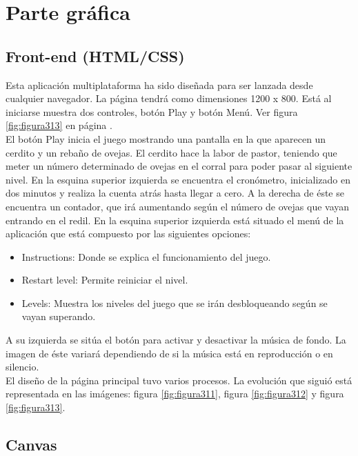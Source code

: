 \section{Parte gráfica}
\label{chap:grafica}

\subsection{Front-end (HTML/CSS)}
\label{sec:front_end}

Esta aplicación multiplataforma ha sido diseñada para ser lanzada desde cualquier navegador. La página tendrá como dimensiones 1200 x 800. 
Está al iniciarse muestra dos controles, botón Play y botón Menú. Ver figura \ref{fig:figura313} en página \pageref{fig:figura313}.\\

El botón Play inicia el juego mostrando una pantalla en la que aparecen un cerdito y un rebaño de ovejas. El cerdito hace la labor de pastor, 
teniendo que meter un número determinado de ovejas en el corral para poder pasar al siguiente nivel. 
En la esquina superior izquierda se encuentra el cronómetro, inicializado en dos minutos y realiza la cuenta atrás hasta llegar a cero.
A la derecha de éste se encuentra un contador, que irá aumentando según el número de ovejas que vayan entrando en el redil.
En la esquina superior izquierda está situado el menú de la aplicación que está compuesto por las siguientes opciones:

\begin{itemize}
 \item Instructions: Donde se explica el funcionamiento del juego.
 \item Restart level: Permite reiniciar el nivel.
 \item Levels: Muestra los niveles del juego que se irán desbloqueando según se vayan superando.
\end{itemize}

A su izquierda se sitúa el botón para activar y desactivar la música de fondo. La imagen de éste variará dependiendo de si la música 
está en reproducción o en silencio.\\

El diseño de la página principal tuvo varios procesos. La evolución que siguió está representada en las imágenes: figura \ref{fig:figura311}, figura \ref{fig:figura312} y 
figura \ref{fig:figura313}.


\subsection{Canvas}
\label{sec:canvas}

